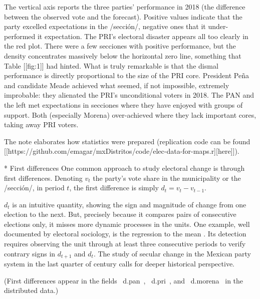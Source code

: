 \documentclass[letter,12pt]{article}
\begin{document}
The vertical axis reports the three parties' performance in 2018 (the difference between the observed vote and the forecast). Positive values indicate that the party excelled expectations in the /sección/, negative ones that it under-performed it expectation. The PRI's electoral disaster appears all too clearly in the red plot. There were a few secciones with positive performance, but the density concentrates massively below the horizontal zero line, something that Table [[fig:1]] had hinted. What is truly remarkable is that the dismal performance is directly proportional to the size of the PRI core. President Peña and candidate Meade achieved what seemed, if not impossible, extremely improbable: they alienated the PRI's unconditional voters in 2018. The PAN and the left met expectations in secciones where they have enjoyed with groups of support. Both (especially Morena) over-achieved where they lack important cores, taking away PRI voters. 

The note elaborates how statistics were prepared (replication code can be found [[https://github.com/emagar/mxDistritos/code/elec-data-for-maps.r][here]]).



* First differences
One common approach to study electoral change is through first differences. Denoting $v_t$ the party's vote share in the municipality or the /sección/, in period $t$, the first difference is simply $d_t = v_t - v_{t-1}$. 

$d_t$ is an intuitive quantity, showing the sign and magnitude of change from one election to the next. But, precisely because it compares pairs of consecutive elections only, it misses more dynamic processes in the units. One example, well documented by electoral sociology, is the regression to the mean \citep{campbell.1991,segovia.1979}. Its detection requires observing the unit through at least three consecutive periods to verify contrary signs in $d_{t+1}$ and $d_t$. The study of secular change in the Mexican party system in the last quarter of century calls for deeper historical perspective. 

(First differences appear in the fields ~d.pan~, ~d.pri~, and ~d.morena~ in the distributed data.)
\end{document}
